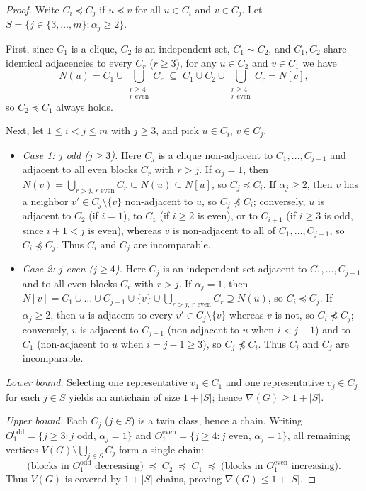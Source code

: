 \documentclass[11pt,a4paper]{article}
\theoremstyle{definition}
\begin{document}
\begin{proof}
  Write $C_i \preceq C_j$ if $u \preceq v$ for all $u \in C_i$ and $v \in C_j$. Let $S = \{j \in \{3,\dots,m\} : \alpha_j \ge 2\}$.

  First, since $C_1$ is a clique, $C_2$ is an independent set, $C_1 \sim C_2$, and $C_1, C_2$ share identical adjacencies to every $C_r$ ($r \ge 3$), for any $u \in C_2$ and $v \in C_1$ we have
  \[
    N(u) = C_1 \cup \bigcup_{\substack{r \ge 4 \\ r\text{ even}}} C_r \;\subseteq\; C_1 \cup C_2 \cup \bigcup_{\substack{r \ge 4 \\ r\text{ even}}} C_r = N[v],
  \]
  so $C_2 \preceq C_1$ always holds.

  Next, let $1 \le i < j \le m$ with $j \ge 3$, and pick $u \in C_i$, $v \in C_j$.
  \begin{itemize}
    \item \emph{Case 1: $j$ odd ($j \ge 3$).} Here $C_j$ is a clique non-adjacent to $C_1,\dots,C_{j-1}$ and adjacent to all even blocks $C_r$ with $r > j$. If $\alpha_j = 1$, then $N(v) = \bigcup_{r>j,\, r\text{ even}} C_r \subseteq N(u) \subseteq N[u]$, so $C_j \preceq C_i$. If $\alpha_j \ge 2$, then $v$ has a neighbor $v' \in C_j \setminus \{v\}$ non-adjacent to $u$, so $C_j \not\preceq C_i$; conversely, $u$ is adjacent to $C_2$ (if $i=1$), to $C_1$ (if $i \ge 2$ is even), or to $C_{i+1}$ (if $i \ge 3$ is odd, since $i+1 < j$ is even), whereas $v$ is non-adjacent to all of $C_1,\dots,C_{j-1}$, so $C_i \not\preceq C_j$. Thus $C_i$ and $C_j$ are incomparable.
    \item \emph{Case 2: $j$ even ($j \ge 4$).} Here $C_j$ is an independent set adjacent to $C_1,\dots,C_{j-1}$ and to all even blocks $C_r$ with $r > j$. If $\alpha_j = 1$, then $N[v] = C_1 \cup \dots \cup C_{j-1} \cup \{v\} \cup \bigcup_{r>j,\, r\text{ even}} C_r \supseteq N(u)$, so $C_i \preceq C_j$. If $\alpha_j \ge 2$, then $u$ is adjacent to every $v' \in C_j \setminus \{v\}$ whereas $v$ is not, so $C_i \not\preceq C_j$; conversely, $v$ is adjacent to $C_{j-1}$ (non-adjacent to $u$ when $i < j-1$) and to $C_1$ (non-adjacent to $u$ when $i = j-1 \ge 3$), so $C_j \not\preceq C_i$. Thus $C_i$ and $C_j$ are incomparable.
  \end{itemize}

  \emph{Lower bound.} Selecting one representative $v_1 \in C_1$ and one representative $v_j \in C_j$ for each $j \in S$ yields an antichain of size $1 + |S|$; hence $\nabla(G) \ge 1 + |S|$.

  \emph{Upper bound.} Each $C_j$ ($j \in S$) is a twin class, hence a chain. Writing $O_1^{\mathrm{odd}} = \{j \ge 3 : j\text{ odd},\, \alpha_j = 1\}$ and $O_1^{\mathrm{even}} = \{j \ge 4 : j\text{ even},\, \alpha_j = 1\}$, all remaining vertices $V(G) \setminus \bigcup_{j\in S} C_j$ form a single chain:
  \[
    \bigl(\text{blocks in } O_1^{\mathrm{odd}}\text{ decreasing}\bigr) \;\preceq\; C_2 \;\preceq\; C_1 \;\preceq\; \bigl(\text{blocks in } O_1^{\mathrm{even}}\text{ increasing}\bigr).
  \]
  Thus $V(G)$ is covered by $1 + |S|$ chains, proving $\nabla(G) \le 1 + |S|$.
\end{proof}
\end{document}
